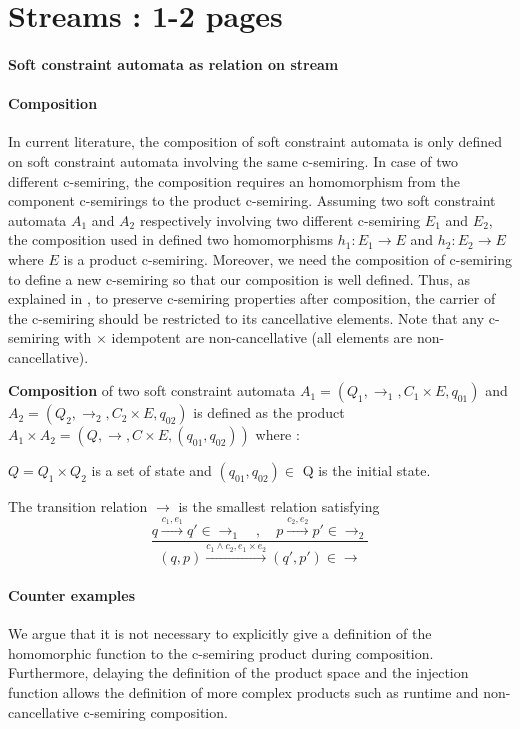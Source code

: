 \section{Streams : 1-2 pages}
\paragraph{Soft constraint automata as relation on stream}

\paragraph{Composition} 
In current literature, the composition of soft constraint automata is only defined on soft constraint automata involving the same c-semiring. In case of two different c-semiring, the composition requires an homomorphism from the component c-semirings to the product c-semiring. Assuming two soft constraint automata $A_1$ and $A_2$ respectively involving two different c-semiring $E_1$ and $E_2$, the composition used in \cite{?} defined two homomorphisms $h_1 : E_1 \rightarrow E$ and $h_2 : E_2 \rightarrow E$ where $E$ is a product c-semiring. Moreover, we need the composition of c-semiring to define a new c-semiring so that our composition is well defined. Thus, as explained in \cite{?}, to preserve c-semiring properties after composition, the carrier of the c-semiring should be restricted to its cancellative elements. Note that any c-semiring with $\times$ idempotent are non-cancellative (all elements are non-cancellative).
\begin{definition}
	\textbf{Composition} of two soft constraint automata $A_1=(Q_1,\rightarrow_1, C_1 \times E, q_{01})$ and $A_2=(Q_2,\rightarrow_2, C_2\times E, q_{02})$ is defined as the product $ A_1 \times A_2 = (Q, \rightarrow, C\times E, (q_{01},q_{02}) )$ where : 
	\begin{list}{-}{ }
		\item $Q= Q_1 \times Q_2 $ is a set of state and $(q_{01},q_{02})\in$ Q is the initial state.
		\item The transition relation $\rightarrow$ is the smallest relation satisfying
		$$
		\frac{q \xrightarrow{c_1,e_1} q' \in \rightarrow _1 \quad , \quad p\xrightarrow{c_2,e_2}p' \in \rightarrow_2}{(q,p) \xrightarrow{c_1 \land c_2,e_1 \times e_2}(q',p') \in \rightarrow}
		$$
	\end{list}
\end{definition}
\paragraph{Counter examples}
We argue that it is not necessary to explicitly give a definition of the homomorphic function to the c-semiring product during composition. Furthermore, delaying the definition of the product space and the injection function allows the definition of more complex products such as runtime and non-cancellative c-semiring composition.